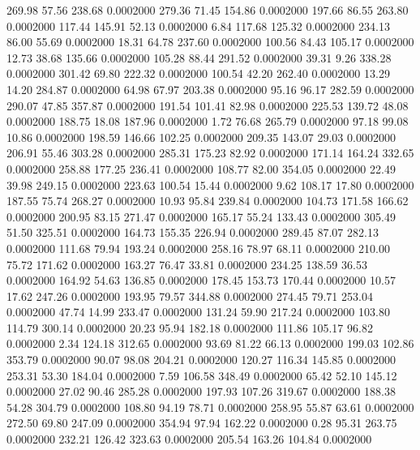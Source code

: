  269.98   57.56  238.68   0.0002000
 279.36   71.45  154.86   0.0002000
 197.66   86.55  263.80   0.0002000
 117.44  145.91   52.13   0.0002000
   6.84  117.68  125.32   0.0002000
 234.13   86.00   55.69   0.0002000
  18.31   64.78  237.60   0.0002000
 100.56   84.43  105.17   0.0002000
  12.73   38.68  135.66   0.0002000
 105.28   88.44  291.52   0.0002000
  39.31    9.26  338.28   0.0002000
 301.42   69.80  222.32   0.0002000
 100.54   42.20  262.40   0.0002000
  13.29   14.20  284.87   0.0002000
  64.98   67.97  203.38   0.0002000
  95.16   96.17  282.59   0.0002000
 290.07   47.85  357.87   0.0002000
 191.54  101.41   82.98   0.0002000
 225.53  139.72   48.08   0.0002000
 188.75   18.08  187.96   0.0002000
   1.72   76.68  265.79   0.0002000
  97.18   99.08   10.86   0.0002000
 198.59  146.66  102.25   0.0002000
 209.35  143.07   29.03   0.0002000
 206.91   55.46  303.28   0.0002000
 285.31  175.23   82.92   0.0002000
 171.14  164.24  332.65   0.0002000
 258.88  177.25  236.41   0.0002000
 108.77   82.00  354.05   0.0002000
  22.49   39.98  249.15   0.0002000
 223.63  100.54   15.44   0.0002000
   9.62  108.17   17.80   0.0002000
 187.55   75.74  268.27   0.0002000
  10.93   95.84  239.84   0.0002000
 104.73  171.58  166.62   0.0002000
 200.95   83.15  271.47   0.0002000
 165.17   55.24  133.43   0.0002000
 305.49   51.50  325.51   0.0002000
 164.73  155.35  226.94   0.0002000
 289.45   87.07  282.13   0.0002000
 111.68   79.94  193.24   0.0002000
 258.16   78.97   68.11   0.0002000
 210.00   75.72  171.62   0.0002000
 163.27   76.47   33.81   0.0002000
 234.25  138.59   36.53   0.0002000
 164.92   54.63  136.85   0.0002000
 178.45  153.73  170.44   0.0002000
  10.57   17.62  247.26   0.0002000
 193.95   79.57  344.88   0.0002000
 274.45   79.71  253.04   0.0002000
  47.74   14.99  233.47   0.0002000
 131.24   59.90  217.24   0.0002000
 103.80  114.79  300.14   0.0002000
  20.23   95.94  182.18   0.0002000
 111.86  105.17   96.82   0.0002000
   2.34  124.18  312.65   0.0002000
  93.69   81.22   66.13   0.0002000
 199.03  102.86  353.79   0.0002000
  90.07   98.08  204.21   0.0002000
 120.27  116.34  145.85   0.0002000
 253.31   53.30  184.04   0.0002000
   7.59  106.58  348.49   0.0002000
  65.42   52.10  145.12   0.0002000
  27.02   90.46  285.28   0.0002000
 197.93  107.26  319.67   0.0002000
 188.38   54.28  304.79   0.0002000
 108.80   94.19   78.71   0.0002000
 258.95   55.87   63.61   0.0002000
 272.50   69.80  247.09   0.0002000
 354.94   97.94  162.22   0.0002000
   0.28   95.31  263.75   0.0002000
 232.21  126.42  323.63   0.0002000
 205.54  163.26  104.84   0.0002000
